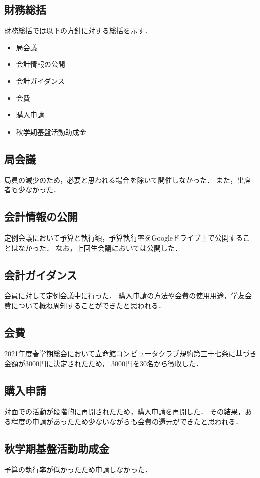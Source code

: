\subsection*{財務総括}


財務総括では以下の方針に対する総括を示す．
\begin{itemize}
    \item 局会議
    \item 会計情報の公開
    \item 会計ガイダンス
    \item 会費
    \item 購入申請
    \item 秋学期基盤活動助成金
\end{itemize}

\subsection*{局会議}
局員の減少のため，必要と思われる場合を除いて開催しなかった．
また，出席者も少なかった．

\subsection*{会計情報の公開}
定例会議において予算と執行額，予算執行率をGoogleドライブ上で公開することはなかった．
なお，上回生会議においては公開した．

\subsection*{会計ガイダンス}
会員に対して定例会議中に行った．
購入申請の方法や会費の使用用途，学友会費について概ね周知することができたと思われる．

\subsection*{会費}
2021年度春学期総会において立命館コンピュータクラブ規約第三十七条に基づき金額が3000円に決定されたため，
3000円を30名から徴収した．

\subsection*{購入申請}
対面での活動が段階的に再開されたため，購入申請を再開した．
その結果，ある程度の申請があったため少ないながらも会費の還元ができたと思われる．

\subsection*{秋学期基盤活動助成金}
予算の執行率が低かったため申請しなかった．
